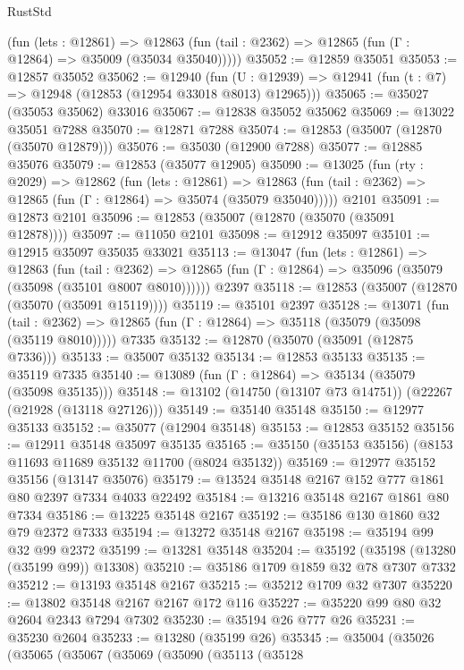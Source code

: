 \begin{lexlean}{RustStd}
\begin{coremodule}
      (fun (lets : @12861) =>
      @12863 (fun (tail : @2362) => @12865 (fun (Γ : @12864) => @35009 (@35034 @35040)))))
@35052 := @12859 @35051
@35053 := @12857 @35052
@35062 := @12940
    (fun (U : @12939) => @12941 (fun (t : @7) => @12948 (@12853 (@12954 @33018 @8013) @12965)))
@35065 := @35027 (@35053 @35062) @33016
@35067 := @12838 @35052 @35062
@35069 := @13022 @35051 @7288
@35070 := @12871 @7288
@35074 := @12853 (@35007 (@12870 (@35070 @12879)))
@35076 := @35030 (@12900 @7288)
@35077 := @12885 @35076
@35079 := @12853 (@35077 @12905)
@35090 := @13025
    (fun (rty : @2029) =>
    @12862
      (fun (lets : @12861) =>
      @12863 (fun (tail : @2362) => @12865 (fun (Γ : @12864) => @35074 (@35079 @35040)))))
    @2101
@35091 := @12873 @2101
@35096 := @12853 (@35007 (@12870 (@35070 (@35091 @12878))))
@35097 := @11050 @2101
@35098 := @12912 @35097
@35101 := @12915 @35097 @35035 @33021
@35113 := @13047
    (fun (lets : @12861) =>
    @12863
      (fun (tail : @2362) =>
      @12865 (fun (Γ : @12864) => @35096 (@35079 (@35098 (@35101 @8007 @8010))))))
    @2397
@35118 := @12853 (@35007 (@12870 (@35070 (@35091 @15119))))
@35119 := @35101 @2397
@35128 := @13071
    (fun (tail : @2362) => @12865 (fun (Γ : @12864) => @35118 (@35079 (@35098 (@35119 @8010)))))
    @7335
@35132 := @12870 (@35070 (@35091 (@12875 @7336)))
@35133 := @35007 @35132
@35134 := @12853 @35133
@35135 := @35119 @7335
@35140 := @13089 (fun (Γ : @12864) => @35134 (@35079 (@35098 @35135)))
@35148 := @13102 (@14750 (@13107 @73 @14751)) (@22267 (@21928 (@13118 @27126)))
@35149 := @35140 @35148
@35150 := @12977 @35133
@35152 := @35077 (@12904 @35148)
@35153 := @12853 @35152
@35156 := @12911 @35148 @35097 @35135
@35165 := @35150 (@35153 @35156) (@8153 @11693 @11689 @35132 @11700 (@8024 @35132))
@35169 := @12977 @35152 @35156 (@13147 @35076)
@35179 := @13524 @35148 @2167 @152 @777 @1861 @80 @2397 @7334 @4033 @22492
@35184 := @13216 @35148 @2167 @1861 @80 @7334
@35186 := @13225 @35148 @2167
@35192 := @35186 @130 @1860 @32 @79 @2372 @7333
@35194 := @13272 @35148 @2167
@35198 := @35194 @99 @32 @99 @2372
@35199 := @13281 @35148
@35204 := @35192 (@35198 (@13280 (@35199 @99)) @13308)
@35210 := @35186 @1709 @1859 @32 @78 @7307 @7332
@35212 := @13193 @35148 @2167
@35215 := @35212 @1709 @32 @7307
@35220 := @13802 @35148 @2167 @2167 @172 @116
@35227 := @35220 @99 @80 @32 @2604 @2343 @7294 @7302
@35230 := @35194 @26 @777 @26
@35231 := @35230 @2604
@35233 := @13280 (@35199 @26)
@35345 := @35004
    (@35026
      (@35065
        (@35067
          (@35069
            (@35090
              (@35113
                (@35128

\end{coremodule}
\end{lexlean}
